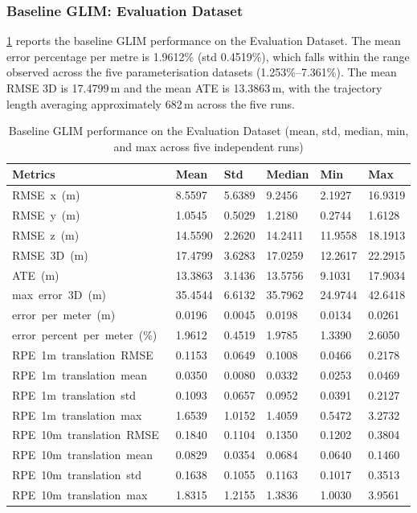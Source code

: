 \subsubsection{Baseline GLIM: Evaluation Dataset}

\cref{tab:eval_baseline_performance} reports the baseline GLIM performance on the Evaluation Dataset. The mean error percentage per metre is 1.9612\% (std 0.4519\%), which falls within the range observed across the five parameterisation datasets (1.253\%--7.361\%). The mean RMSE 3D is 17.4799\,m and the mean ATE is 13.3863\,m, with the trajectory length averaging approximately 682\,m across the five runs.

\begin{table}[htbp]
\centering
\caption{Baseline GLIM performance on the Evaluation Dataset (mean, std, median, min, and max across five independent runs)}
\label{tab:eval_baseline_performance}
\begin{tabularx}{\textwidth}{lXXXXX}
\toprule
\textbf{Metrics} & \textbf{Mean} & \textbf{Std} & \textbf{Median} & \textbf{Min} & \textbf{Max} \\ \midrule
RMSE\ x\ (m)\        & 8.5597  & 5.6389 & 9.2456  & 2.1927  & 16.9319 \\
RMSE\ y\ (m)\        & 1.0545  & 0.5029 & 1.2180  & 0.2744  & 1.6128  \\
RMSE\ z\ (m)\        & 14.5590 & 2.2620 & 14.2411 & 11.9558 & 18.1913 \\
RMSE\ 3D\ (m)\       & 17.4799 & 3.6283 & 17.0259 & 12.2617 & 22.2915 \\
ATE\ (m)\            & 13.3863 & 3.1436 & 13.5756 & 9.1031  & 17.9034 \\
max\ error\ 3D\ (m)\ & 35.4544 & 6.6132 & 35.7962 & 24.9744 & 42.6418 \\
error\ per\ meter\ (m)\        & 0.0196  & 0.0045 & 0.0198  & 0.0134  & 0.0261  \\
error\ percent\ per\ meter\ (\%)\ & 1.9612  & 0.4519 & 1.9785  & 1.3390  & 2.6050  \\
RPE\ 1m\ translation\ RMSE\  & 0.1153 & 0.0649 & 0.1008 & 0.0466 & 0.2178 \\
RPE\ 1m\ translation\ mean\  & 0.0350 & 0.0080 & 0.0332 & 0.0253 & 0.0469 \\
RPE\ 1m\ translation\ std\   & 0.1093 & 0.0657 & 0.0952 & 0.0391 & 0.2127 \\
RPE\ 1m\ translation\ max\   & 1.6539 & 1.0152 & 1.4059 & 0.5472 & 3.2732 \\
RPE\ 10m\ translation\ RMSE\ & 0.1840 & 0.1104 & 0.1350 & 0.1202 & 0.3804 \\
RPE\ 10m\ translation\ mean\ & 0.0829 & 0.0354 & 0.0684 & 0.0640 & 0.1460 \\
RPE\ 10m\ translation\ std\  & 0.1638 & 0.1055 & 0.1163 & 0.1017 & 0.3513 \\
RPE\ 10m\ translation\ max\  & 1.8315 & 1.2155 & 1.3836 & 1.0030 & 3.9561 \\ \bottomrule
\end{tabularx}
\end{table}

